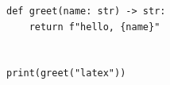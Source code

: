 \documentclass{article}
\begin{document}
\begin{verbatim}
def greet(name: str) -> str:
    return f"hello, {name}"


print(greet("latex"))
\end{verbatim}
\end{document}
